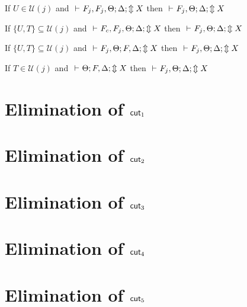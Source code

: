 \documentclass[12pt]{article}
\begin{document}
\begin{theorem}[$\C$]
	If $U\in\mathcal{U}(j)$ and	$\mbox{\ $\vdash$\ } F_j,F_j,\Theta;\Delta;\Updownarrow X$ then $\mbox{\ $\vdash$\ } F_j,\Theta;\Delta;\Updownarrow X$
\end{theorem}

\begin{theorem}[$\C_c$]
	If $\{U,T\}\subseteq\mathcal{U}(j)$ and	$\mbox{\ $\vdash$\ } F_c,F_j,\Theta;\Delta;\Updownarrow X$ then $\mbox{\ $\vdash$\ } F_j,\Theta;\Delta;\Updownarrow X$
\end{theorem}

\begin{theorem}[$\A_c$]
	If $\{U,T\}\subseteq\mathcal{U}(j)$ and	$\mbox{\ $\vdash$\ } F_j,\Theta;F,\Delta;\Updownarrow X$ then $\mbox{\ $\vdash$\ } F_j,\Theta;\Delta;\Updownarrow X$
\end{theorem}


\begin{theorem}[$\A_l$]
	If $T\in\mathcal{U}(j)$ and	$\mbox{\ $\vdash$\ } \Theta;F,\Delta;\Updownarrow X$ then $\mbox{\ $\vdash$\ } F_j,\Theta;\Delta;\Updownarrow X$
\end{theorem}

\newpage
\section{Elimination of $\mathsf{cut}_1$}

\newpage
\section{Elimination of $\mathsf{cut}_2$}

\newpage
\section{Elimination of $\mathsf{cut}_3$}

\newpage
\section{Elimination of $\mathsf{cut}_4$}

\newpage
\section{Elimination of $\mathsf{cut}_5$}

\end{document}
